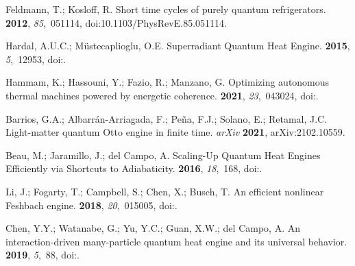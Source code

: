 \documentclass[preprints,article,accept,moreauthors,pdftex]{Definitions/mdpi}
\begin{document}
\begin{thebibliography}{999}
Feldmann, T.; Kosloff, R.
\newblock Short time cycles of purely quantum refrigerators.
 {\bf 2012}, {\em 85},~051114,
\linebreak
  doi:10.1103/PhysRevE.85.051114.

Hardal, A.U.C.; M\"ustecaplioglu, O.E.
\newblock Superradiant Quantum Heat Engine.
 {\bf 2015}, {\em 5},~12953,
\newblock
  doi:{\href{https://doi.org/10.1038/srep12953}{}}.

Hammam, K.; Hassouni, Y.; Fazio, R.; Manzano, G.
\newblock Optimizing autonomous thermal machines powered by energetic
  coherence.
 {\bf 2021}, {\em 23},~043024,
\newblock
  doi:{\href{https://doi.org/10.1088/1367-2630/abeb47}{}}.

Barrios, G.A.; Albarrán-Arriagada, F.; Peña, F.J.; Solano, E.; Retamal, J.C.
\newblock Light-matter quantum {O}tto engine in finite time. \emph{arXiv} \textbf{2021}, arXiv:2102.10559.

Beau, M.; Jaramillo, J.; del Campo, A.
\newblock Scaling-Up Quantum Heat Engines Efficiently via Shortcuts to
  Adiabaticity.
 {\bf 2016}, {\em 18},~168,
\newblock
  doi:{\href{https://doi.org/10.3390/e18050168}{}}.

Li, J.; Fogarty, T.; Campbell, S.; Chen, X.; Busch, T.
\newblock An efficient nonlinear {Feshbach} engine.
 {\bf 2018}, {\em 20},~015005,
\newblock
  doi:{\href{https://doi.org/10.1088/1367-2630/aa9cd8}{}}.

Chen, Y.Y.; Watanabe, G.; Yu, Y.C.; Guan, X.W.; del Campo, A.
\newblock An interaction-driven many-particle quantum heat engine and its
  universal behavior.
 {\bf 2019}, {\em 5},~88,
\newblock
  doi:{\href{https://doi.org/10.1038/s41534-019-0204-5}{}}.


\end{thebibliography}
\end{document}
